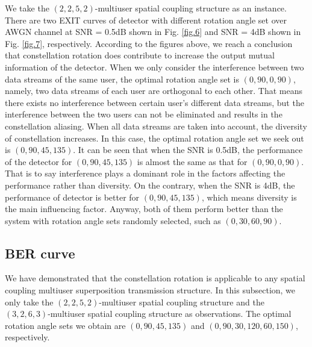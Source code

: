 \documentclass[conference]{IEEEtran}
\begin{document}
We take the $(2,2,5,2)$-multiuser spatial coupling structure as an instance. There are two EXIT curves of detector with different rotation angle set over AWGN channel at SNR = 0.5dB shown in Fig. \ref{fig.6} and SNR = 4dB shown in Fig. \ref{fig.7}, respectively. According to the figures above, we reach a conclusion that constellation rotation does contribute to increase the output mutual information of the detector. When we only consider the interference between two data streams of the same user, the optimal rotation angle set is $(0,90,0,90)$, namely, two data streams of each user are orthogonal to each other. That means there exists no interference between certain user's different data streams, but the interference between the two users can not be eliminated and results in the constellation aliasing. When all data streams are taken into account, the diversity of constellation increases. In this case, the optimal rotation angle set we seek out is $(0,90,45,135)$. It can be seen that when the SNR is 0.5dB, the performance of the detector for $(0,90,45,135)$ is almost the same as that for $(0,90,0,90)$. That is to say interference plays a dominant role in the factors affecting the performance rather than diversity. On the contrary, when the SNR is 4dB, the performance of detector is better for $(0,90,45,135)$, which means diversity is the main influencing factor. Anyway, both of them perform better than the system with rotation angle sets randomly selected, such as $(0,30,60,90)$.
\subsection{BER curve}
We have demonstrated that the constellation rotation is applicable to any spatial coupling multiuser superposition transmission structure. In this subsection, we only take the $(2,2,5,2)$-multiuser spatial coupling structure and the $(3,2,6,3)$-multiuser spatial coupling structure as observations. The optimal rotation angle sets we obtain are $(0,90,45,135)$ and $(0,90,30,120,60,150)$, respectively.
\end{document}
